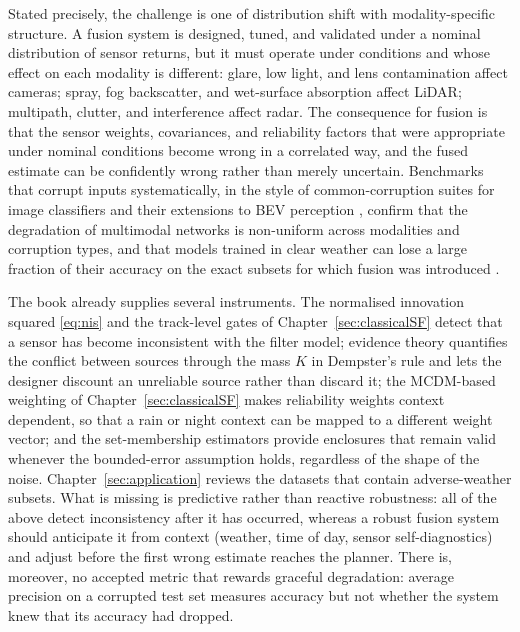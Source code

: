 Stated precisely, the challenge is one of distribution shift with modality-specific structure. A fusion system is designed, tuned, and validated under a nominal distribution of sensor returns, but it must operate under conditions  and whose effect on each modality is different: glare, low light, and lens contamination affect cameras; spray, fog backscatter, and wet-surface absorption affect LiDAR; multipath, clutter, and interference affect radar. The consequence for fusion is that the sensor weights, covariances, and reliability factors that were appropriate under nominal conditions become wrong in a correlated way, and the fused estimate can be confidently wrong rather than merely uncertain. Benchmarks that corrupt inputs systematically, in the style of common-corruption suites for image classifiers \cite{hendrycks2019_corruptions} and their extensions to BEV perception \cite{dong2023_robobev}, confirm that the degradation of multimodal networks is non-uniform across modalities and corruption types, and that models trained in clear weather can lose a large fraction of their accuracy on the exact subsets for which fusion was introduced \cite{bijelic2020_stf,feng2021_multimodal_survey}.

The book already supplies several instruments. The normalised innovation squared \eqref{eq:nis} and the track-level gates of Chapter~\ref{sec:classicalSF} detect that a sensor has become inconsistent with the filter model; evidence theory quantifies the conflict between sources through the mass $K$ in Dempster's rule and lets the designer discount an unreliable source rather than discard it; the MCDM-based weighting of Chapter~\ref{sec:classicalSF} makes reliability weights context dependent, so that a rain or night context can be mapped to a different weight vector; and the set-membership estimators provide enclosures that remain valid whenever the bounded-error assumption holds, regardless of the shape of the noise. Chapter~\ref{sec:application} reviews the datasets that contain adverse-weather subsets. What is missing is predictive rather than reactive robustness: all of the above detect inconsistency after it has occurred, whereas a robust fusion system should anticipate it from context (weather, time of day, sensor self-diagnostics) and adjust before the first wrong estimate reaches the planner. There is, moreover, no accepted metric that rewards graceful degradation: average precision on a corrupted test set measures accuracy but not whether the system knew that its accuracy had dropped.

